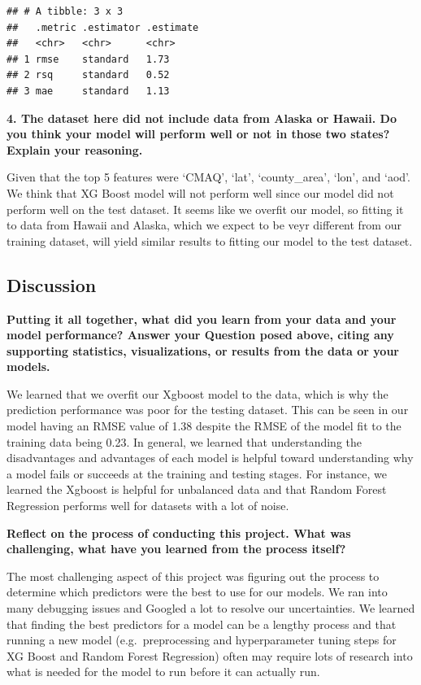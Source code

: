 \documentclass[
]{article}
\begin{document}
\begin{verbatim}
## # A tibble: 3 x 3
##   .metric .estimator .estimate
##   <chr>   <chr>      <chr>    
## 1 rmse    standard   1.73     
## 2 rsq     standard   0.52     
## 3 mae     standard   1.13
\end{verbatim}

\textbf{4. The dataset here did not include data from Alaska or Hawaii.
Do you think your model will perform well or not in those two states?
Explain your reasoning.}

Given that the top 5 features were `CMAQ', `lat', `county\_area', `lon',
and `aod'. We think that XG Boost model will not perform well since our
model did not perform well on the test dataset. It seems like we overfit
our model, so fitting it to data from Hawaii and Alaska, which we expect
to be veyr different from our training dataset, will yield similar
results to fitting our model to the test dataset.

\hypertarget{discussion}{%
\subsection{Discussion}\label{discussion}}

\textbf{Putting it all together, what did you learn from your data and
your model performance? Answer your Question posed above, citing any
supporting statistics, visualizations, or results from the data or your
models.}

We learned that we overfit our Xgboost model to the data, which is why
the prediction performance was poor for the testing dataset. This can be
seen in our model having an RMSE value of 1.38 despite the RMSE of the
model fit to the training data being 0.23. In general, we learned that
understanding the disadvantages and advantages of each model is helpful
toward understanding why a model fails or succeeds at the training and
testing stages. For instance, we learned the Xgboost is helpful for
unbalanced data and that Random Forest Regression performs well for
datasets with a lot of noise.

\textbf{Reflect on the process of conducting this project. What was
challenging, what have you learned from the process itself?}

The most challenging aspect of this project was figuring out the process
to determine which predictors were the best to use for our models. We
ran into many debugging issues and Googled a lot to resolve our
uncertainties. We learned that finding the best predictors for a model
can be a lengthy process and that running a new model
(e.g.~preprocessing and hyperparameter tuning steps for XG Boost and
Random Forest Regression) often may require lots of research into what
is needed for the model to run before it can actually run.
\end{document}

